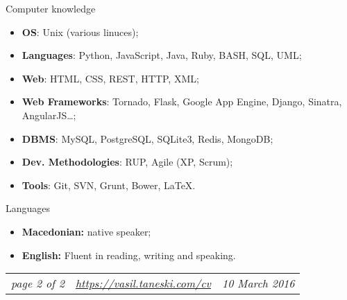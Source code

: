 \documentclass[]{mcdowellcv}
\begin{document}
    \begin{cvsection}{Computer knowledge}
    \label{Computer knowledge}
        \begin{cvsubsection}{}{}{}
            \begin{itemize}
                \item \textbf{OS}: Unix (various linuces);
                \item \textbf{Languages}: Python, JavaScript, Java, Ruby, BASH, SQL, UML;
                \item \textbf{Web}: HTML, CSS, REST, HTTP, XML;
                \item \textbf{Web Frameworks}: Tornado, Flask, Google App Engine, Django, Sinatra, AngularJS\ldots;
                \item \textbf{DBMS}: MySQL, PostgreSQL, SQLite3, Redis, MongoDB;
                \item \textbf{Dev. Methodologies}: RUP, Agile (XP, Scrum);
                \item \textbf{Tools}: Git, SVN, Grunt, Bower, \LaTeX.
            \end{itemize}
        \end{cvsubsection}
    \end{cvsection}

    \begin{cvsection}{Languages}
    \label{Languages}
        \begin{cvsubsection}{}{}{}
            \begin{itemize}
                \item \textbf{Macedonian:} native speaker;
                \item \textbf{English:} Fluent in reading, writing and speaking.
            \end{itemize}
        \end{cvsubsection}
    \end{cvsection}
    \vfill
    \begin{tabu} to 1\textwidth {X[l,m] X[c,m] X[r,m]}
        \textit{page 2 of 2} &
        \textit{\url{https://vasil.taneski.com/cv}} &
        \textit{10 March 2016}
    \end{tabu}
    \clearpage
\end{document}
